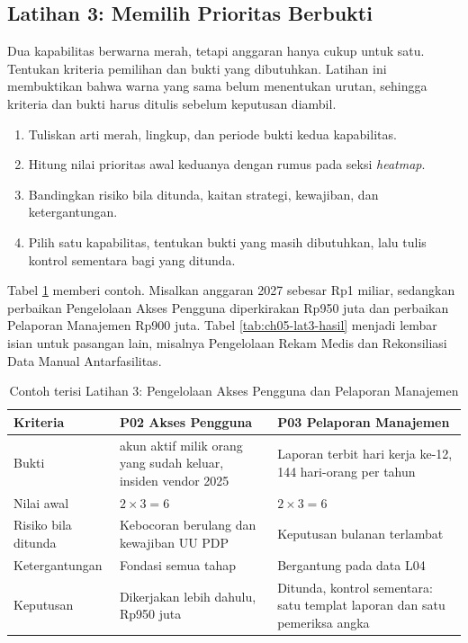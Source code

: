 \subsection*{Latihan 3: Memilih Prioritas Berbukti}

Dua kapabilitas berwarna merah, tetapi anggaran hanya cukup untuk satu. Tentukan kriteria pemilihan dan bukti yang dibutuhkan. Latihan ini
membuktikan bahwa warna yang sama belum menentukan urutan,
sehingga kriteria dan bukti harus ditulis sebelum keputusan diambil.

\begin{enumerate}
  \item Tuliskan arti merah, lingkup, dan periode bukti kedua kapabilitas.
  \item Hitung nilai prioritas awal keduanya dengan rumus pada seksi \textit{heatmap}.
  \item Bandingkan risiko bila ditunda, kaitan strategi, kewajiban, dan ketergantungan.
  \item Pilih satu kapabilitas, tentukan bukti yang masih dibutuhkan, lalu tulis kontrol sementara bagi yang ditunda.
\end{enumerate}

Tabel \ref{tab:ch05-lat3-contoh} memberi contoh. Misalkan anggaran 2027 sebesar Rp1 miliar, sedangkan perbaikan Pengelolaan Akses Pengguna diperkirakan
Rp950 juta dan perbaikan Pelaporan Manajemen Rp900 juta. Tabel \ref{tab:ch05-lat3-hasil} menjadi lembar isian untuk pasangan lain, misalnya Pengelolaan
Rekam Medis dan Rekonsiliasi Data Manual Antarfasilitas.

\begin{table}[!htb]
  \centering
  \caption{Contoh terisi Latihan 3: Pengelolaan Akses Pengguna dan Pelaporan Manajemen}
  \label{tab:ch05-lat3-contoh}
  \small
  \begin{tabularx}{\textwidth}{>{\raggedright\arraybackslash}p{2.6cm}>{\raggedright\arraybackslash}X>{\raggedright\arraybackslash}X}
    \hline
    \textbf{Kriteria} & \textbf{P02 Akses Pengguna} & \textbf{P03 Pelaporan Manajemen} \\
    \hline
    Bukti & 212 akun aktif milik orang yang sudah keluar, insiden vendor 2025 & Laporan terbit hari kerja ke-12, 144 hari-orang per tahun \\
    \hline
    Nilai awal & $2 \times 3 = 6$ & $2 \times 3 = 6$ \\
    \hline
    Risiko bila ditunda & Kebocoran berulang dan kewajiban UU PDP & Keputusan bulanan terlambat \\
    \hline
    Ketergantungan & Fondasi semua tahap & Bergantung pada data L04 \\
    \hline
    Keputusan & Dikerjakan lebih dahulu, Rp950 juta & Ditunda, kontrol sementara: satu templat laporan dan satu pemeriksa angka \\
    \hline
  \end{tabularx}
\end{table}

